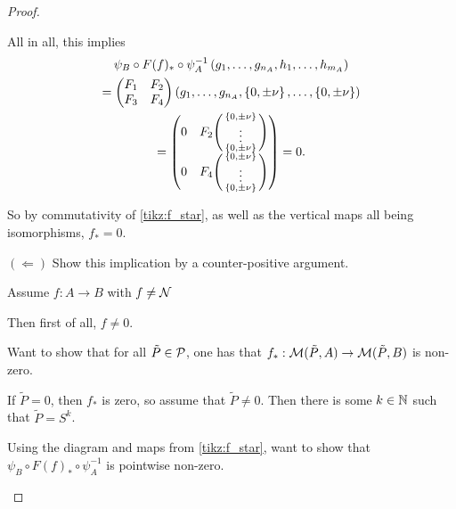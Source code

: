 \begin{proof}
\begin{enumerate}
{            All in all, this implies
            \begin{multline*}
                \psi_B \circ F(f)_* \circ \psi_A^{-1} \left( g_1, \dots, g_{n_A}, h_1, \dots, h_{m_A} \right) \\
                = \begin{pmatrix}
                    F_1 & F_2 \\
                    F_3 & F_4
                \end{pmatrix} \left( g_1, \dots, g_{n_A}, \left\{ 0, \pm \nu \right\}, \dots, \left\{ 0, \pm \nu \right\} \right) \\
                = \begin{pmatrix}
                    0 & F_2 \begin{psmallmatrix}
                        \left\{ 0, \pm \nu \right\} \\
                        \vdots \\
                        \left\{ 0, \pm \nu \right\}
                    \end{psmallmatrix} \\
                    0 & F_4 \begin{psmallmatrix}
                        \left\{ 0, \pm \nu \right\} \\
                        \vdots \\
                        \left\{ 0, \pm \nu \right\}
                    \end{psmallmatrix} \\
                \end{pmatrix} 
                = 0.
            \end{multline*}

            So by commutativity of \autoref{tikz:f_star}, as well as the vertical maps all being isomorphisms, \( f_* = 0 \).

            \( ( \Leftarrow ) \) Show this implication by a counter-positive argument.

            Assume \( f: A \to B \) with \( f \neq {\mathcal{N}} \)

            Then first of all, \( f \neq 0 \).

            Want to show that for all \( \tilde{P} \in {\mathcal{P}} \), one has that \( f_*: {\mathcal{M}}(\tilde{P}, A) \to {\mathcal{M}}(\tilde{P}, B)\) is non-zero.

            If \( \tilde{P} = 0 \), then \( f_* \) is zero, so assume that \( \tilde{P} \neq 0 \). Then there is some \( k \in {\mathbb{N}} \) such that \( \tilde{P} = S^k \).

            Using the diagram and maps from \autoref{tikz:f_star}, want to show that \( \psi_B \circ F(f)_* \circ \psi_A^{-1} \) is pointwise non-zero.

}
\end{enumerate}
\end{proof}
